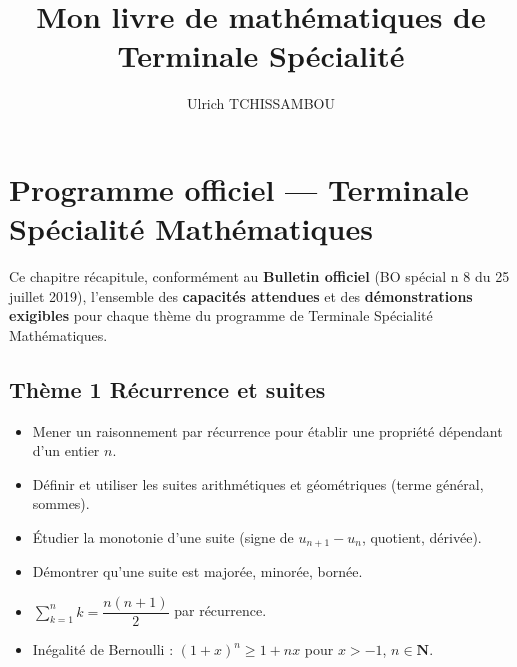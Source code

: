 \documentclass[11pt,a4paper,openany]{book}
\author{Ulrich TCHISSAMBOU}
\title{Mon livre de mathématiques de Terminale Spécialité}
\theoremstyle{definition}
\begin{document}
    \renewcommand{\thesection}{\Alph{section})}
    \renewcommand{\thesubsection}{\arabic{subsection})}
    \tableofcontents

    \chapter*{Programme officiel --- Terminale Spécialité Mathématiques}

    Ce chapitre récapitule, conformément au \textbf{Bulletin officiel} (BO spécial
    n\degre{} 8 du 25 juillet 2019), l'ensemble des \textbf{capacités attendues}
    et des \textbf{démonstrations exigibles} pour chaque thème du programme de
    Terminale Spécialité Mathématiques.

    \bigskip

    \section*{Thème 1 \textemdash{} Récurrence et suites}
    \begin{capacitesbox}
    \begin{itemize}
        \item Mener un raisonnement par récurrence pour établir une propriété
              dépendant d'un entier $n$.
        \item Définir et utiliser les suites arithmétiques et géométriques
              (terme général, sommes).
        \item Étudier la monotonie d'une suite (signe de $u_{n+1}-u_n$,
              quotient, dérivée).
        \item Démontrer qu'une suite est majorée, minorée, bornée.
    \end{itemize}
    \end{capacitesbox}
    \begin{demoprogbox}
    \begin{itemize}
        \item $\displaystyle\sum_{k=1}^{n}k=\dfrac{n(n+1)}{2}$ par récurrence.
        \item Inégalité de Bernoulli : $(1+x)^n\geq 1+nx$
              pour $x>-1$, $n\in\mathbf{N}$.
    \end{itemize}
    \end{demoprogbox}
\end{document}
